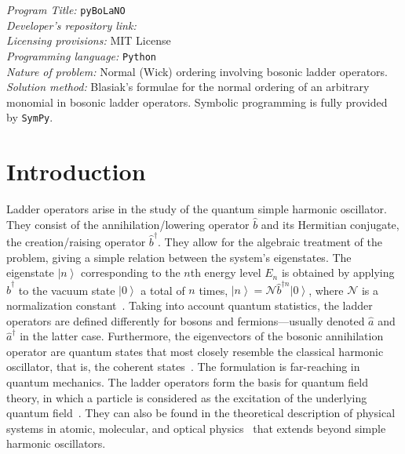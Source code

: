 \documentclass[5p, twocolumn, 10pt, sort&compress]{elsarticle}
\newcommand{\ket}[1]{\left|{#1}\right\rangle}
\newcommand{\bop}{\hat{b}}
\newcommand{\bdag}{\bop^\dagger}
\begin{document}


\begin{small}
\noindent
{\em Program Title:} \texttt{pyBoLaNO}
\\
{\em Developer's repository link:} \href{https://github.com/hendry24/pyBoLaNO}{}
\\
{\em Licensing provisions:} MIT License
\\
{\em Programming language:} \texttt{Python}
\\
{\em Nature of problem:} Normal (Wick) ordering involving bosonic ladder operators. 
\\
{\em Solution method:} Blasiak's formulae for the normal ordering of an arbitrary monomial in bosonic ladder operators. Symbolic programming is fully provided by \texttt{SymPy}.
\end{small}


\section{Introduction}
\label{Introduction}

Ladder operators arise in the study of the quantum simple harmonic oscillator. They consist of the annihilation/lowering operator $\bop$ and its Hermitian conjugate, the creation/raising operator $\bdag$. They allow for the algebraic treatment of the problem, giving a simple relation between the system's eigenstates. The eigenstate $\ket{n}$ corresponding to the $n$th energy level $E_n$ is obtained by applying $\hat{b}^\dagger$ to the vacuum state $\ket{0}$ a total of $n$ times, $\ket{n}=\mathcal{N}\hat{b}^{\dagger n}\ket{0}$, where $\mathcal{N}$ is a normalization constant~\cite{griffiths_introduction_2018, lancaster_quantum_2014}. Taking into account quantum statistics, the ladder operators are defined differently for bosons and fermions---usually denoted $\hat{a}$ and $\hat{a}^\dagger$ in the latter case. Furthermore, the eigenvectors of the bosonic annihilation operator are quantum states that most closely resemble the classical harmonic oscillator, that is, the coherent states~\cite{gerry_introductory_2005}. The formulation is far-reaching in quantum mechanics. The ladder operators form the basis for quantum field theory, in which a particle is considered as the excitation of the underlying quantum field~\cite{lancaster_quantum_2014}. They can also be found in the theoretical description of physical systems in atomic, molecular, and optical physics~\cite{gerry_introductory_2005} that extends beyond simple harmonic oscillators. 
\end{document}
